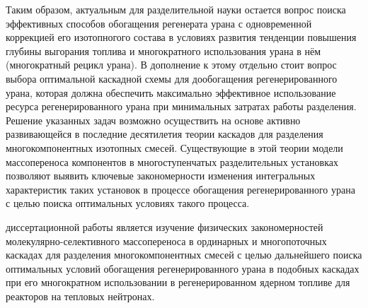 Таким образом, актуальным для разделительной науки остается вопрос поиска эффективных способов обогащения регенерата урана с одновременной коррекцией его изотопногого состава в условиях развития тенденции повышения глубины выгорания топлива и многократного использования урана в нём (многократный рецикл урана). В дополнение к этому отдельно стоит вопрос выбора оптимальной каскадной схемы для дообогащения регенерированного урана, которая должна обеспечить максимально эффективное использование ресурса регенерированного урана при минимальных затратах работы разделения.
Решение указанных задач возможно осуществить на основе активно развивающейся в последние десятилетия теории каскадов для разделения многокомпонентных изотопных смесей. Существующие в этой теории модели массопереноса компонентов в многоступенчатых разделительных установках позволяют выявить ключевые закономерности изменения интегральных характеристик таких установок в процессе обогащения регенерированного урана с целью поиска оптимальных условиях такого процесса.

{\aim} диссертационной работы является изучение физических закономерностей
молекулярно-селективного массопереноса в ординарных и многопоточных каскадах
для разделения многокомпонентных смесей с целью дальнейшего поиска
оптимальных условий обогащения регенерированного урана в подобных каскадах при
его многократном использовании в регенерированном ядерном топливе для реакторов на тепловых нейтронах. 

